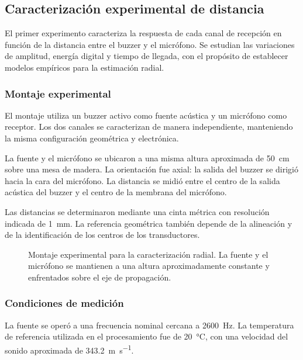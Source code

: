 \subsection{Caracterización experimental de distancia}
\label{sec:exp01_distancia}

El primer experimento caracteriza la respuesta de cada
canal de recepción en función de la distancia entre el
buzzer y el micrófono. Se estudian las variaciones de
amplitud, energía digital y tiempo de llegada, con el
propósito de establecer modelos empíricos para la
estimación radial.

\subsubsection{Montaje experimental}

El montaje utiliza un buzzer activo como fuente acústica
y un micrófono como receptor. Los dos canales se
caracterizan de manera independiente, manteniendo
la misma configuración geométrica y electrónica.

La fuente y el micrófono se ubicaron a una misma altura
aproximada de \SI{50}{\centi\metre} sobre una mesa de
madera. La orientación fue axial: la salida del buzzer
se dirigió hacia la cara del micrófono. La distancia
se midió entre el centro de la salida acústica del
buzzer y el centro de la membrana del micrófono.

Las distancias se determinaron mediante una cinta métrica 
con resolución indicada de \SI{1}{\milli\metre}.
La referencia geométrica también depende de la alineación
y de la identificación de los centros de los transductores.

\begin{figure}[!htbp]
    \centering
    
    \caption{Montaje experimental para la caracterización
    radial. La fuente y el micrófono se mantienen a una
    altura aproximadamente constante y enfrentados sobre
    el eje de propagación.}
    \label{fig:montaje_exp01}
\end{figure}

\subsubsection{Condiciones de medición}

La fuente se operó a una frecuencia nominal cercana a
\SI{2600}{\hertz}. La temperatura de referencia utilizada
en el procesamiento fue de \SI{20}{\degreeCelsius},
con una velocidad del sonido aproximada de
\SI{343.2}{\metre\per\second}.

